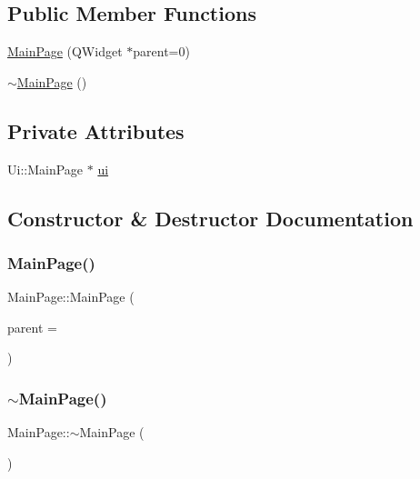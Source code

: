 \subsection*{Public Member Functions}
\begin{DoxyCompactItemize}
\item 
\mbox{\hyperlink{class_main_page_ac1cb25631c5e11634076fb9e8c59d01d}{Main\+Page}} (Q\+Widget $\ast$parent=0)
\item 
\mbox{\hyperlink{class_main_page_a072231b7d4b6632a480203b77fafb165}{$\sim$\+Main\+Page}} ()
\end{DoxyCompactItemize}
\subsection*{Private Attributes}
\begin{DoxyCompactItemize}
\item 
Ui\+::\+Main\+Page $\ast$ \mbox{\hyperlink{class_main_page_a06cf83c45e3c018adf7409c4a296d9f4}{ui}}
\end{DoxyCompactItemize}


\subsection{Constructor \& Destructor Documentation}
\mbox{\label{class_main_page_ac1cb25631c5e11634076fb9e8c59d01d}} 
\subsubsection{\texorpdfstring{MainPage()}{MainPage()}}
{\footnotesize\ttfamily Main\+Page\+::\+Main\+Page (\begin{DoxyParamCaption}\item[{Q\+Widget $\ast$}]{parent = {} }\end{DoxyParamCaption})\hspace{0.3cm}{\ttfamily [explicit]}}

\mbox{\label{class_main_page_a072231b7d4b6632a480203b77fafb165}} 
\subsubsection{\texorpdfstring{$\sim$MainPage()}{~MainPage()}}
{\footnotesize\ttfamily Main\+Page\+::$\sim$\+Main\+Page (\begin{DoxyParamCaption}{ }\end{DoxyParamCaption})}



